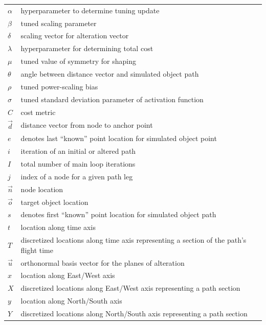\documentclass[conf]{new-aiaa}
\begin{document}
{\renewcommand\arraystretch{1.0}
\noindent\begin{longtable*}{@{}l @{\quad=\quad} l@{}}
$\alpha$ & hyperparameter to determine tuning update \\
$\beta$  & tuned scaling parameter \\
$\delta$ & scaling vector for alteration vector \\
$\lambda$ & hyperparameter for determining total cost \\
$\mu$ & tuned value of symmetry for shaping \\
$\theta$ & angle between distance vector and simulated object path \\
$\rho$ & tuned power-scaling bias \\
$\sigma$ & tuned standard deviation parameter of activation function \\
$C$ & cost metric \\
$\vec{d}$ & distance vector from node to anchor point\\
$e$ & denotes last ``known'' point location for simulated object point \\
$i$ & iteration of an initial or altered path \\
$I$ & total number of main loop iterations \\
$j$ & index of a node for a given path leg \\
$\vec{n}$ & node location \\
$\vec{o}$ & target object location \\
$s$ & denotes first ``known'' point location for simulated object path \\
$t$ & location along time axis \\
$T$ & discretized locations along time axis representing a section of the path's flight time \\
$\vec{u}$ & orthonormal basis vector for the planes of alteration \\
$x$ & location along East/West axis \\
$X$ & discretized locations along East/West axis representing a path section \\
$y$ & location along North/South axis \\
$Y$ & discretized locations along North/South axis representing a path section \\
\end{longtable*}}

\end{document}
